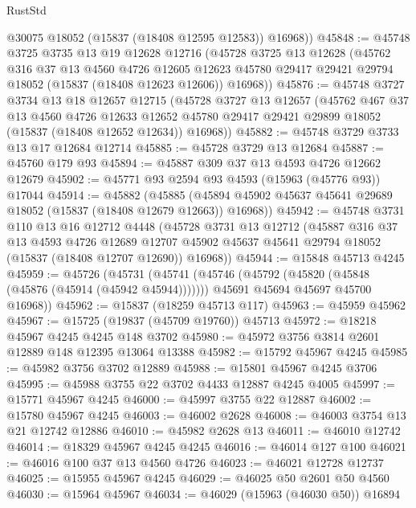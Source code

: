 \begin{lexlean}{RustStd}
\begin{coremodule}
        @30075
        @18052
        (@15837 (@18408 @12595 @12583))
        @16968))
@45848 := @45748
    @3725
    @3735
    @13
    @19
    @12628
    @12716
    (@45728
      @3725
      @13
      @12628
      (@45762
        @316
        @37
        @13
        @4560
        @4726
        @12605
        @12623
        @45780
        @29417
        @29421
        @29794
        @18052
        (@15837 (@18408 @12623 @12606))
        @16968))
@45876 := @45748
    @3727
    @3734
    @13
    @18
    @12657
    @12715
    (@45728
      @3727
      @13
      @12657
      (@45762
        @467
        @37
        @13
        @4560
        @4726
        @12633
        @12652
        @45780
        @29417
        @29421
        @29899
        @18052
        (@15837 (@18408 @12652 @12634))
        @16968))
@45882 := @45748 @3729 @3733 @13 @17 @12684 @12714
@45885 := @45728 @3729 @13 @12684
@45887 := @45760 @179 @93
@45894 := @45887 @309 @37 @13 @4593 @4726 @12662 @12679
@45902 := @45771 @93 @2594 @93 @4593 (@15963 (@45776 @93)) @17044
@45914 := @45882
    (@45885 (@45894 @45902 @45637 @45641 @29689 @18052 (@15837 (@18408 @12679 @12663)) @16968))
@45942 := @45748
    @3731
    @110
    @13
    @16
    @12712
    @4448
    (@45728
      @3731
      @13
      @12712
      (@45887
        @316
        @37
        @13
        @4593
        @4726
        @12689
        @12707
        @45902
        @45637
        @45641
        @29794
        @18052
        (@15837 (@18408 @12707 @12690))
        @16968))
@45944 := @15848 @45713 @4245
@45959 := @45726
    (@45731
      (@45741
        (@45746 (@45792 (@45820 (@45848 (@45876 (@45914 (@45942 @45944)))))))
        @45691
        @45694
        @45697
        @45700
        @16968))
@45962 := @15837 (@18259 @45713 @117)
@45963 := @45959 @45962
@45967 := @15725 (@19837 (@45709 @19760)) @45713
@45972 := @18218 @45967 @4245 @4245 @148 @3702
@45980 := @45972 @3756 @3814 @2601 @12889 @148 @12395 @13064 @13388
@45982 := @15792 @45967 @4245
@45985 := @45982 @3756 @3702 @12889
@45988 := @15801 @45967 @4245 @3706
@45995 := @45988 @3755 @22 @3702 @4433 @12887 @4245 @4005
@45997 := @15771 @45967 @4245
@46000 := @45997 @3755 @22 @12887
@46002 := @15780 @45967 @4245
@46003 := @46002 @2628
@46008 := @46003 @3754 @13 @21 @12742 @12886
@46010 := @45982 @2628 @13
@46011 := @46010 @12742
@46014 := @18329 @45967 @4245 @4245
@46016 := @46014 @127 @100
@46021 := @46016 @100 @37 @13 @4560 @4726
@46023 := @46021 @12728 @12737
@46025 := @15955 @45967 @4245
@46029 := @46025 @50 @2601 @50 @4560
@46030 := @15964 @45967
@46034 := @46029 (@15963 (@46030 @50)) @16894

\end{coremodule}
\end{lexlean}
